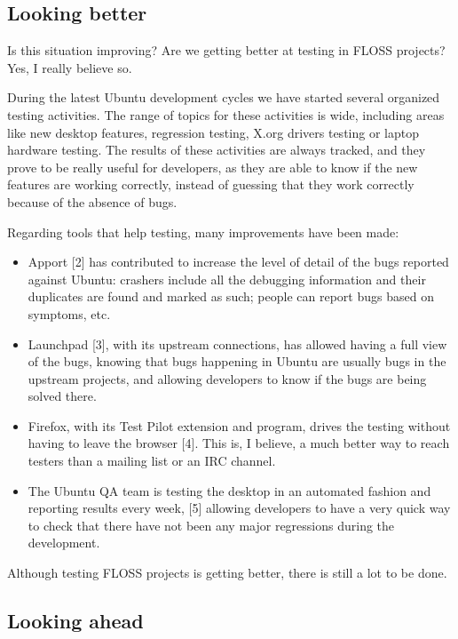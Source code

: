 \subsection*{Looking better}

Is this situation improving? Are we getting better at testing in FLOSS projects? Yes, I really believe so.

During the latest Ubuntu development cycles we have started several organized testing activities. The range of topics for these activities is wide, including areas like new desktop features, regression testing, X.org drivers testing or laptop hardware testing. The results of these activities are always tracked, and they prove to be really useful for developers, as they are able to know if the new features are working correctly, instead of guessing that they work correctly because of the absence of bugs.

Regarding tools that help testing, many improvements have been made:
\begin{itemize}
 \item Apport [2] has contributed to increase the level of detail of the bugs reported against Ubuntu: crashers include all the debugging information and their duplicates are found and marked as such; people can report bugs based on symptoms, etc.
 \item Launchpad [3], with its upstream connections, has allowed having a full view of the bugs, knowing that bugs happening in Ubuntu are usually bugs in the upstream projects, and allowing developers to know if the bugs are being solved there. 
 \item Firefox, with its Test Pilot extension and program, drives the testing without having to leave the browser [4]. This is, I believe, a much better way to reach testers than a mailing list or an IRC channel.
 \item The Ubuntu QA team is testing the desktop in an automated fashion and reporting results every week, [5] allowing developers to have a very quick way to check that there have not been any major regressions during the development.
\end{itemize}

Although testing FLOSS projects is getting better, there is still a lot to be done.

\subsection*{Looking ahead}

